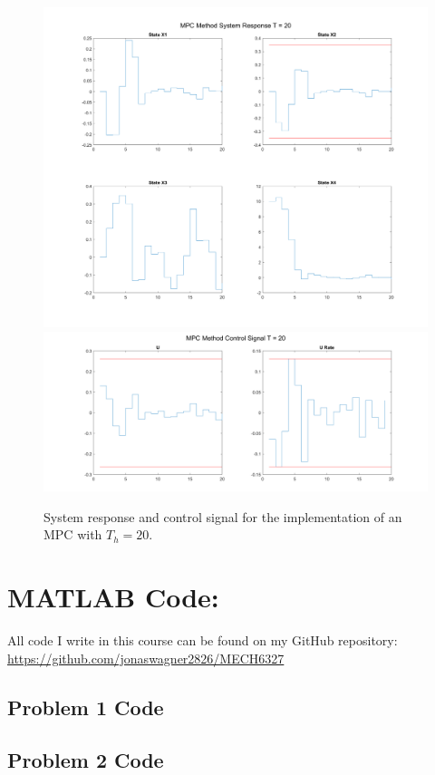 \documentclass[letter]{article}
\begin{document}
\begin{figure}[p]
	\centering
	\includegraphics[width=\linewidth]{fig/pblm2_MPC_T20_sys_response}
	\includegraphics[width=\linewidth]{fig/pblm2_MPC_T20_ctrl_signal}
	\caption{System response and control signal for the implementation of an MPC with $T_h = 20$.}
	\label{fig:pblm2mpcT20}
\end{figure}




\newpage
\appendix
\section{MATLAB Code:}\label{apx:matlab}
All code I write in this course can be found on my GitHub repository:\\
\href{https://github.com/jonaswagner2826/MECH6337}{https://github.com/jonaswagner2826/MECH6327}

\newpage
\subsection{Problem 1 Code}\label{apx:matlab_pblm1}

\newpage
\subsection{Problem 2 Code}\label{apx:matlab_pblm2}

\end{document}
